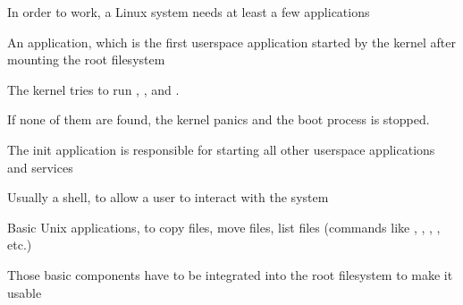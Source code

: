   \startitemize
  \item In order to work, a Linux system needs at least a few
    applications
  \item An  application, which is the first userspace
    application started by the kernel after mounting the root
    filesystem
    \startitemize
    \item The kernel tries to run , ,
       and .
    \item If none of them are found, the kernel panics and the boot
      process is stopped.
    \item The init application is responsible for starting all other
      userspace applications and services
    \stopitemize
  \item Usually a shell, to allow a user to interact with the system
  \item Basic Unix applications, to copy files, move files, list files
    (commands like , , , ,
    etc.)
  \item Those basic components have to be integrated into the root
    filesystem to make it usable
  \stopitemize

